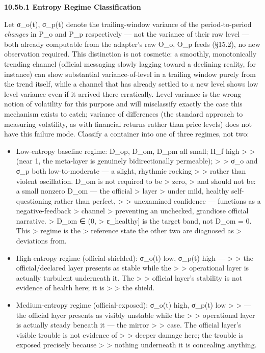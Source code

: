 \documentclass[
]{article}
\begin{document}
\textbf{10.5b.1 Entropy Regime Classification}

Let σ\_o(t), σ\_p(t) denote the trailing-window variance of the
period-to-period \emph{changes} in P\_o and P\_p respectively --- not
the variance of their raw level --- both already computable from the
adapter's raw O\_o, O\_p feeds (§15.2), no new observation required.
This distinction is not cosmetic: a smoothly, monotonically trending
channel (official messaging slowly lagging toward a declining reality,
for instance) can show substantial variance-of-level in a trailing
window purely from the trend itself, while a channel that has already
settled to a new level shows low level-variance even if it arrived there
erratically. Level-variance is the wrong notion of volatility for this
purpose and will misclassify exactly the case this mechanism exists to
catch; variance of differences (the standard approach to measuring
volatility, as with financial returns rather than price levels) does not
have this failure mode. Classify a container into one of three regimes,
not two:

\begin{itemize}
\item
  Low-entropy baseline regime: D\_op, D\_om, D\_pm all small; Π\_f high
  \textgreater{} \textgreater{} (near 1, the meta-layer is genuinely
  bidirectionally permeable); \textgreater{} \textgreater{} σ\_o and
  σ\_p both low-to-moderate --- a slight, rhythmic rocking
  \textgreater{} \textgreater{} rather than violent oscillation. D\_om
  is not required to be \textgreater{} zero, \textgreater{} and should
  not be: a small nonzero D\_om --- the official \textgreater{} layer
  \textgreater{} under mild, healthy self-questioning rather than
  perfect, \textgreater{} \textgreater{} unexamined confidence ---
  functions as a negative-feedback \textgreater{} channel \textgreater{}
  preventing an unchecked, grandiose official narrative. \textgreater{}
  D\_om ∈ (0, \textgreater{} ε\_healthy{]} is the target band, not D\_om
  = 0. This \textgreater{} regime is the \textgreater{} reference state
  the other two are diagnosed as \textgreater{} deviations from.
\item
  High-entropy regime (official-shielded): σ\_o(t) low, σ\_p(t) high ---
  \textgreater{} \textgreater{} the official/declared layer presents as
  stable while the \textgreater{} \textgreater{} operational layer is
  actually turbulent underneath it. The \textgreater{} \textgreater{}
  official layer's stability is not evidence of health here; it is
  \textgreater{} \textgreater{} the shield.
\item
  Medium-entropy regime (official-exposed): σ\_o(t) high, σ\_p(t) low
  \textgreater{} \textgreater{} --- the official layer presents as
  visibly unstable while the \textgreater{} \textgreater{} operational
  layer is actually steady beneath it --- the mirror \textgreater{}
  \textgreater{} case. The official layer's visible trouble is not
  evidence of \textgreater{} \textgreater{} deeper damage here; the
  trouble is exposed precisely because \textgreater{} \textgreater{}
  nothing underneath it is concealing anything.
\end{itemize}
\end{document}
